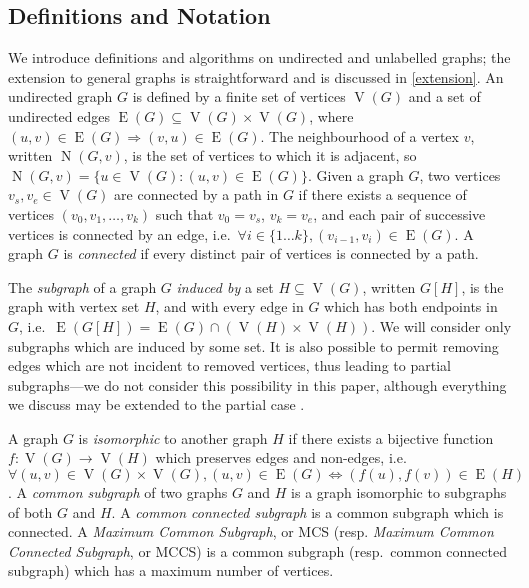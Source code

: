 \documentclass{llncs}
\begin{document}
\subsection{Definitions and Notation}

We introduce definitions and algorithms on undirected and unlabelled graphs; the
extension to general graphs is straightforward and is discussed in \cref{extension}. An undirected
graph $G$ is defined by a finite set of vertices $\operatorname{V}(G)$ and a set of undirected edges
$\operatorname{E}(G) \subseteq \operatorname{V}(G) \times \operatorname{V}(G)$, where $(u, v) \in
\operatorname{E}(G) \Rightarrow (v, u) \in \operatorname{E}(G)$. The neighbourhood of
a vertex $v$, written $\operatorname{N}(G, v)$, is the set of vertices to which it is adjacent, so
$\operatorname{N}(G, v) = \{ u \in \operatorname{V}(G) : (u, v) \in \operatorname{E}(G) \}$.
Given a graph $G$, two vertices $v_s, v_e \in \operatorname{V}(G)$ are connected by a path in $G$ if
there exists a sequence of vertices $(v_0, v_1, \ldots, v_k)$ such that $v_0 = v_s$, $v_k = v_e$,
and each pair of successive vertices is connected by an edge, i.e.\ $\forall i\in \{1 \ldots k \},
(v_{i-1}, v_i) \in \operatorname{E}(G)$. A graph $G$ is \emph{connected} if every distinct pair
of vertices is connected by a path.

The \emph{subgraph} of a graph $G$ \emph{induced by} a set $H \subseteq \operatorname{V}(G)$,
written $G[H]$, is the graph with vertex set $H$, and with every edge in $G$ which has both
endpoints in $G$, i.e.\ $\operatorname{E}(G[H]) = \operatorname{E}(G) \cap (\operatorname{V}(H) \times
\operatorname{V}(H))$. We will consider only subgraphs which are induced by some set. It is also
possible to permit removing edges which are not incident to removed vertices, thus leading to
partial subgraphs---we do not consider this possibility in this paper, although everything we
discuss may be extended to the partial case \cite{DBLP:conf/mco/VismaraV08,DBLP:conf/cp/NdiayeS11}.

A graph $G$ is \emph{isomorphic} to another graph $H$ if there exists a bijective function $f :
\operatorname{V}(G) \rightarrow \operatorname{V}(H)$ which preserves edges and non-edges, i.e.\
$\forall (u, v) \in \operatorname{V}(G) \times \operatorname{V}(G), (u, v) \in \operatorname{E}(G)
\Leftrightarrow (f(u),f(v)) \in \operatorname{E}(H)$.  A \emph{common subgraph} of two graphs $G$
and $H$ is a graph isomorphic to subgraphs of both $G$ and $H$. A \emph{common connected subgraph} is a
common subgraph which is connected.  A \emph{Maximum Common Subgraph}, or MCS (resp. \emph{Maximum
Common Connected Subgraph}, or MCCS) is a common subgraph (resp.\ common connected subgraph) which has
a maximum number of vertices.
\end{document}
